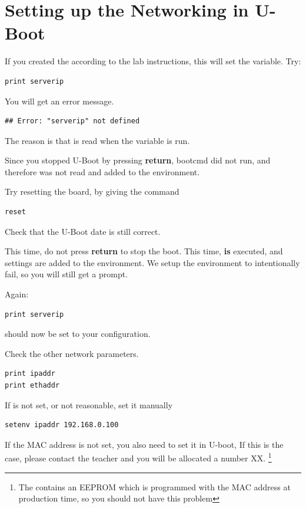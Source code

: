 \clearpage
\section{Setting up the \devboard Networking in U-Boot}

If you created the  according to the lab instructions, 
this will set the  variable. Try:

\begin{verbatim}
print serverip
\end{verbatim}

You will get an error message.

\begin{verbatim}
## Error: "serverip" not defined  
\end{verbatim}

The reason is that  is read when the  variable is run.

Since you stopped U-Boot by pressing {\bf return}, bootcmd did not run,
and therefore  was not read and added to the environment.

Try resetting the board, by giving the command 

\begin{verbatim}
reset
\end{verbatim}

Check that the U-Boot date is still correct.

This time, do not press {\bf return} to stop the boot. This time,  {\bf is} executed,
and  settings are added to the environment.
We setup the environment to intentionally fail, so you will still get a prompt.

Again:

\begin{verbatim}
print serverip
\end{verbatim}

 should now be set to your configuration.

Check the other network parameters.
\begin{verbatim}
print ipaddr
print ethaddr
\end{verbatim}

If  is not set, or not reasonable, set it manually

\begin{verbatim}
setenv ipaddr 192.168.0.100
\end{verbatim}

If the MAC address is not set, you also need to set it in U-boot,
If this is the case, please contact the teacher and you will be allocated
a number XX. \footnote{The \devboard contains an EEPROM which is programmed with the MAC address
 at production time, so you should not have this problem}

